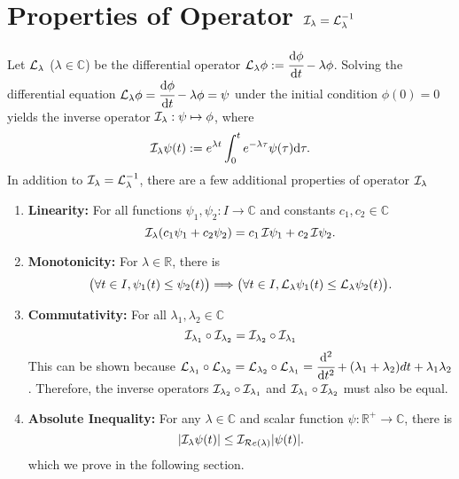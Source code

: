 \chapter{Properties of Operator $\mathcal{I}_{\lambda} = \mathcal{L}_{\lambda}^{-1}$}
\label{appendix:inverse-operator}

Let $\mathcal{L}_{\lambda}$ ($\lambda \in \mathbb{C}$) be the differential operator $\mathcal{L}_{\lambda}\phi := \cfrac{\mathrm{d} \phi}{\mathrm{d} t} - \lambda \phi$. Solving the differential equation $\mathcal{L}_{\lambda}\phi = \cfrac{\mathrm{d} \phi}{\mathrm{d} t} - \lambda \phi = \psi$ under the initial condition $\phi(0) = 0$ yields the inverse operator $\mathcal{I}_\lambda: \psi \mapsto \phi$, where 
\begin{equation}
    \mathcal{I}_\lambda \psi (t) := e^{\lambda t}\int_{0}^{t}e^{-\lambda \tau} \psi(\tau)\mathrm{d}\tau.
\end{equation}
In addition to $\mathcal{I}_{\lambda} = \mathcal{L}^{-1}_{\lambda}$, there are a few additional properties of operator $\mathcal{I}_{\lambda}$
\begin{enumerate}
    \item \textbf{Linearity:} For all functions $\psi_1, \psi_2 : I \to \mathbb{C}$ and constants $c_1, c_2 \in \mathbb{C}$
    \begin{equation}
        \mathcal{I}_{\lambda} (c_1\psi_1 + c_2\psi_2) = c_1\,\mathcal{I}\psi_1 + c_2\,\mathcal{I}\psi_2.
    \end{equation}
    \item \textbf{Monotonicity:} For $\lambda\in \mathbb{R}$, there is 
    \begin{equation}
        \big(\forall t\in I, \psi_1(t) \leq \psi_2(t) \big) \Longrightarrow\big(\forall t \in I, \mathcal{L}_{\lambda}\psi_1(t) \leq \mathcal{L}_{\lambda}\psi_2(t)\big).
    \end{equation}
    \item \textbf{Commutativity:} For all $\lambda_1, \lambda_2 \in \mathbb{C}$
    \begin{equation}
        \mathcal{I}_{\lambda_1} \circ \mathcal{I}_{\lambda_2} = \mathcal{I}_{\lambda_2} \circ \mathcal{I}_{\lambda_1}
    \end{equation}
    This can be shown because $\mathcal{L}_{\lambda_1}\circ\mathcal{L}_{\lambda_2} = \mathcal{L}_{\lambda_2} \circ \mathcal{L}_{\lambda_1} = \cfrac{\mathrm{d}^{2} }{\mathrm{d} t^{2}} + (\lambda_1 + \lambda_2)dt{} + \lambda_1\lambda_2$. Therefore, the inverse operators $\mathcal{I}_{\lambda_2} \circ \mathcal{I}_{\lambda_1}$ and $\mathcal{I}_{\lambda_1}\circ\mathcal{I}_{\lambda_2}$ must also be equal.
    \item \textbf{Absolute Inequality:} For any $\lambda \in \mathbb{C}$ and scalar function $\psi: \mathbb{R}^{+} \to \mathbb{C}$, there is 
    \begin{equation}\label{eq:operator-I-inequality}
        |\mathcal{I}_\lambda \psi(t)| \leq \mathcal{I}_{\mathcal{R}e\left(\lambda\right)}|\psi(t)|.
    \end{equation}
    which we prove in the following section.
\end{enumerate}

